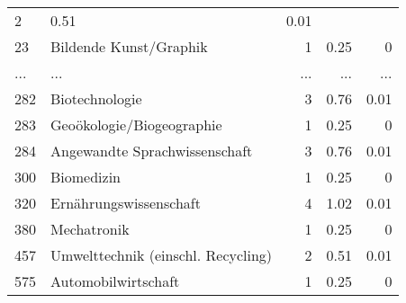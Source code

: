 \begin{longtable}{lXrrr}
          \num{2} &
          \num[round-mode=places,round-precision=2]{0.51} &
          \num[round-mode=places,round-precision=2]{0.01} \\
        23 & \multicolumn{1}{X}{Bildende Kunst/Graphik} & %
          \num{1} &
          \num[round-mode=places,round-precision=2]{0.25} &
          \num[round-mode=places,round-precision=2]{0} \\
       ... & ... & ... & ... & ... \\
        282 & \multicolumn{1}{X}{Biotechnologie} & %
          \num{3} &
          \num[round-mode=places,round-precision=2]{0.76} &
          \num[round-mode=places,round-precision=2]{0.01} \\

        283 & \multicolumn{1}{X}{Geoökologie/Biogeographie} & %
          \num{1} &
          \num[round-mode=places,round-precision=2]{0.25} &
          \num[round-mode=places,round-precision=2]{0} \\

        284 & \multicolumn{1}{X}{Angewandte Sprachwissenschaft} & %
          \num{3} &
          \num[round-mode=places,round-precision=2]{0.76} &
          \num[round-mode=places,round-precision=2]{0.01} \\

        300 & \multicolumn{1}{X}{Biomedizin} & %
          \num{1} &
          \num[round-mode=places,round-precision=2]{0.25} &
          \num[round-mode=places,round-precision=2]{0} \\

        320 & \multicolumn{1}{X}{Ernährungswissenschaft} & %
          \num{4} &
          \num[round-mode=places,round-precision=2]{1.02} &
          \num[round-mode=places,round-precision=2]{0.01} \\

        380 & \multicolumn{1}{X}{Mechatronik} & %
          \num{1} &
          \num[round-mode=places,round-precision=2]{0.25} &
          \num[round-mode=places,round-precision=2]{0} \\

        457 & \multicolumn{1}{X}{Umwelttechnik (einschl. Recycling)} & %
          \num{2} &
          \num[round-mode=places,round-precision=2]{0.51} &
          \num[round-mode=places,round-precision=2]{0.01} \\

        575 & \multicolumn{1}{X}{Automobilwirtschaft} & %
          \num{1} &
          \num[round-mode=places,round-precision=2]{0.25} &
          \num[round-mode=places,round-precision=2]{0} \\


\end{longtable}
